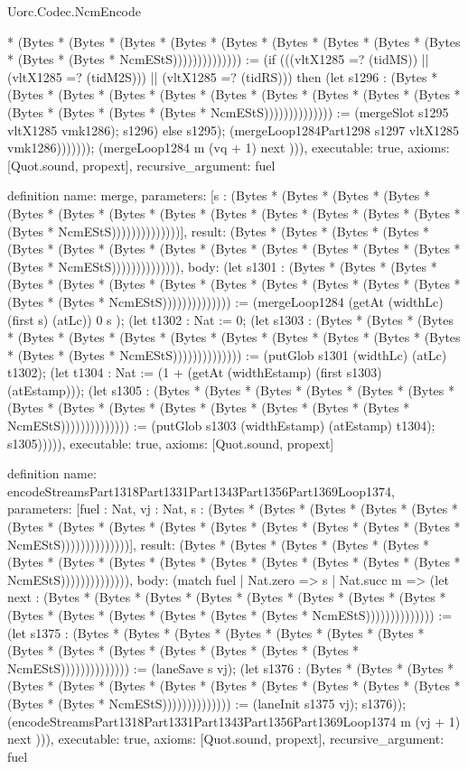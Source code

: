 \begin{lexlean}{Uorc.Codec.NcmEncode}
\begin{semanticmodule}
{* (Bytes * (Bytes * (Bytes * (Bytes * (Bytes * (Bytes * (Bytes * (Bytes * (Bytes * (Bytes * (Bytes * NcmEStS)))))))))))))) := (if (((vltX1285 =? (tidMS)) || (vltX1285 =? (tidM2S))) || (vltX1285 =? (tidRS))) then (let s1296 : (Bytes * (Bytes * (Bytes * (Bytes * (Bytes * (Bytes * (Bytes * (Bytes * (Bytes * (Bytes * (Bytes * (Bytes * (Bytes * (Bytes * NcmEStS)))))))))))))) := (mergeSlot s1295 vltX1285 vmk1286); s1296) else s1295); (mergeLoop1284Part1298 s1297 vltX1285 vmk1286))))))); (mergeLoop1284 m (vq + 1) next ))),
  executable: true,
  axioms: [Quot.sound, propext],
  recursive_argument: fuel
}

definition{
  name: merge,
  parameters: [s : (Bytes * (Bytes * (Bytes * (Bytes * (Bytes * (Bytes * (Bytes * (Bytes * (Bytes * (Bytes * (Bytes * (Bytes * (Bytes * (Bytes * NcmEStS))))))))))))))],
  result: (Bytes * (Bytes * (Bytes * (Bytes * (Bytes * (Bytes * (Bytes * (Bytes * (Bytes * (Bytes * (Bytes * (Bytes * (Bytes * (Bytes * NcmEStS)))))))))))))),
  body: (let s1301 : (Bytes * (Bytes * (Bytes * (Bytes * (Bytes * (Bytes * (Bytes * (Bytes * (Bytes * (Bytes * (Bytes * (Bytes * (Bytes * (Bytes * NcmEStS)))))))))))))) := (mergeLoop1284 (getAt (widthLc) (first s) (atLc)) 0 s ); (let t1302 : Nat := 0; (let s1303 : (Bytes * (Bytes * (Bytes * (Bytes * (Bytes * (Bytes * (Bytes * (Bytes * (Bytes * (Bytes * (Bytes * (Bytes * (Bytes * (Bytes * NcmEStS)))))))))))))) := (putGlob s1301 (widthLc) (atLc) t1302); (let t1304 : Nat := (1 + (getAt (widthEstamp) (first s1303) (atEstamp))); (let s1305 : (Bytes * (Bytes * (Bytes * (Bytes * (Bytes * (Bytes * (Bytes * (Bytes * (Bytes * (Bytes * (Bytes * (Bytes * (Bytes * (Bytes * NcmEStS)))))))))))))) := (putGlob s1303 (widthEstamp) (atEstamp) t1304); s1305))))),
  executable: true,
  axioms: [Quot.sound, propext]
}

definition{
  name: encodeStreamsPart1318Part1331Part1343Part1356Part1369Loop1374,
  parameters: [fuel : Nat, vj : Nat, s : (Bytes * (Bytes * (Bytes * (Bytes * (Bytes * (Bytes * (Bytes * (Bytes * (Bytes * (Bytes * (Bytes * (Bytes * (Bytes * (Bytes * NcmEStS))))))))))))))],
  result: (Bytes * (Bytes * (Bytes * (Bytes * (Bytes * (Bytes * (Bytes * (Bytes * (Bytes * (Bytes * (Bytes * (Bytes * (Bytes * (Bytes * NcmEStS)))))))))))))),
  body: (match fuel
    | Nat.zero => s
    | Nat.succ m => (let next : (Bytes * (Bytes * (Bytes * (Bytes * (Bytes * (Bytes * (Bytes * (Bytes * (Bytes * (Bytes * (Bytes * (Bytes * (Bytes * (Bytes * NcmEStS)))))))))))))) := (let s1375 : (Bytes * (Bytes * (Bytes * (Bytes * (Bytes * (Bytes * (Bytes * (Bytes * (Bytes * (Bytes * (Bytes * (Bytes * (Bytes * (Bytes * NcmEStS)))))))))))))) := (laneSave s vj); (let s1376 : (Bytes * (Bytes * (Bytes * (Bytes * (Bytes * (Bytes * (Bytes * (Bytes * (Bytes * (Bytes * (Bytes * (Bytes * (Bytes * (Bytes * NcmEStS)))))))))))))) := (laneInit s1375 vj); s1376)); (encodeStreamsPart1318Part1331Part1343Part1356Part1369Loop1374 m (vj + 1) next ))),
  executable: true,
  axioms: [Quot.sound, propext],
  recursive_argument: fuel
}


\end{semanticmodule}
\end{lexlean}
